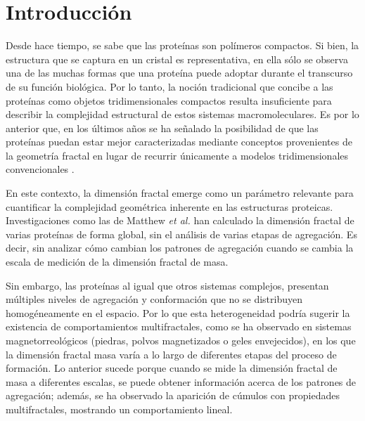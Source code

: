 \chapter{Introducción}

Desde hace tiempo, se sabe que las prote\'{i}nas son pol\'{i}meros compactos. Si bien, la estructura que se captura en un cristal es representativa, en ella s\'{o}lo se observa una de las muchas formas que una prote\'{i}na puede adoptar durante el transcurso de su funci\'{o}n biol\'{o}gica. Por lo tanto, la noci\'{o}n tradicional que concibe a las prote\'{i}nas como objetos tridimensionales compactos resulta insuficiente para describir la complejidad estructural de estos sistemas macromoleculares. Es por lo anterior que, en los últimos años se ha señalado la posibilidad de que las prote\'{i}nas puedan estar mejor caracterizadas mediante conceptos provenientes de la geometría fractal en lugar de recurrir únicamente a modelos tridimensionales convencionales \cite{Dewey1997, Mustafa1996, Vicsek1992 	, Cserzo1991}.

En este contexto, la dimensión fractal emerge como un parámetro relevante para cuantificar la complejidad geométrica inherente en las estructuras proteicas. Investigaciones como las de Matthew \textit{et al.} \cite{Enright2005, Enright2006} han calculado la dimensi\'{o}n fractal de varias prote\'{i}nas de forma global, sin el an\'{a}lisis de varias etapas de agregaci\'{o}n. Es decir, sin analizar c\'{o}mo cambian los patrones de agregaci\'{o}n cuando se cambia la escala de medici\'{o}n de la dimensi\'{o}n fractal de masa.


 Sin embargo, las proteínas al igual que otros sistemas complejos, presentan múltiples niveles de agregación y conformación que no se distribuyen homogéneamente en el espacio. Por lo que esta heterogeneidad podría sugerir la existencia de comportamientos multifractales, como se ha observado en sistemas magnetorreológicos (piedras, polvos magnetizados o geles envejecidos), en los que la dimensión fractal masa varía a lo largo de diferentes etapas del proceso de formación. Lo anterior sucede porque cuando se mide la dimensi\'{o}n fractal de masa a diferentes escalas, se puede obtener informaci\'{o}n acerca de los patrones de agregaci\'{o}n; adem\'{a}s, se ha observado la aparici\'{o}n de c\'{u}mulos  con propiedades multifractales, mostrando un comportamiento lineal.


